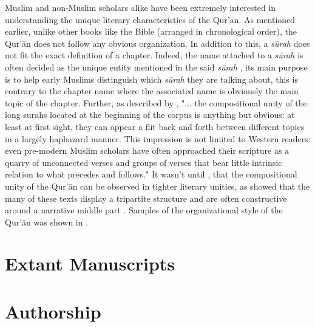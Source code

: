 Muslim and non-Muslim scholars alike have been extremely interested in understanding the unique literary characteristics of the Qur'\=an. As mentioned earlier, unlike other books like the Bible (arranged in chronological order), the Qur'\=an does not follow any obvious organization. In addition to this, a \textit{s\=urah}  does not fit the exact definition of a chapter. Indeed, the name attached to a \textit{s\=urah}  is often decided as the unique entity mentioned in the said \textit{s\=urah} , its main purpose is to help early Muslims distinguish which \textit{s\=urah}  they are talking about, this is contrary to the chapter name where the associated name is obviously the main topic of the chapter. Further, as described by , "... the compositional unity of the long surahs located at the beginning of the corpus is anything but obvious: at least at first sight, they can appear a flit back and forth between different topics in a largely haphazard manner. This impression is not limited to Western readers: even pre-modern Muslim scholars have often approached their scripture as a quarry of unconnected verses and groups of verses that bear little intrinsic relation to what precedes and follows." It wasn't until , that the compositional unity of the Qur'\=an can be observed in tighter literary unities, as  showed that the many of these texts display a tripartite structure and are often constructive around a narrative middle part \cite{sinai2017}. Samples of the organizational style of the Qur'\=an was shown in .

\section{Extant Manuscripts}

\section{Authorship}